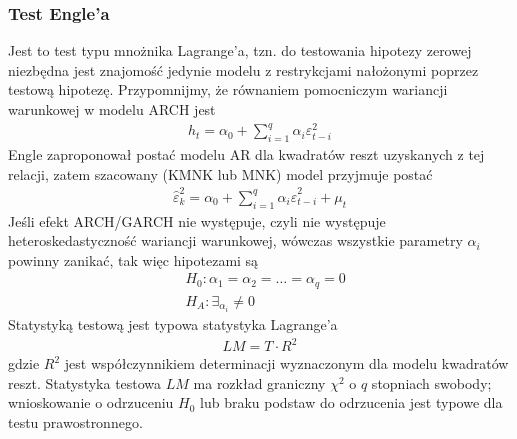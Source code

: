 \subsubsection{Test Engle'a}
Jest to test typu mnożnika Lagrange'a, tzn. do testowania hipotezy zerowej niezbędna jest znajomość jedynie modelu z restrykcjami nałożonymi poprzez testową hipotezę. Przypomnijmy, że równaniem pomocniczym wariancji warunkowej w modelu ARCH jest
\begin{gather*}
h_t=\alpha_0+\sum_{i=1}^{q}\alpha_i\varepsilon_{t-i}^2
\end{gather*}
Engle zaproponował postać modelu AR dla kwadratów reszt uzyskanych z tej relacji, zatem szacowany (KMNK lub MNK) model przyjmuje postać
\begin{gather*}
\hat{\varepsilon}_k^2=\alpha_0+\sum_{i=1}^{q}\alpha_i\hat\varepsilon_{t-i}^2+\mu_t
\end{gather*}
Jeśli efekt ARCH/GARCH nie występuje, czyli nie występuje heteroskedastyczność wariancji warunkowej, wówczas wszystkie parametry $ \alpha_i $ powinny zanikać, tak więc hipotezami są
\begin{align*}
&H_0:\alpha_1=\alpha_2=\dots=\alpha_q=0\\
&H_A:\exists_{\alpha_i}\neq 0
\end{align*}
Statystyką testową jest typowa statystyka Lagrange'a
\begin{gather*}
LM=T\cdot R^2
\end{gather*}
gdzie $ R^2 $ jest współczynnikiem determinacji wyznaczonym dla modelu kwadratów reszt. Statystyka testowa $ LM $ ma rozkład graniczny $ \chi^2 $ o $ q $ stopniach swobody; wnioskowanie o odrzuceniu $ H_0 $ lub braku podstaw do odrzucenia jest typowe dla testu prawostronnego.
